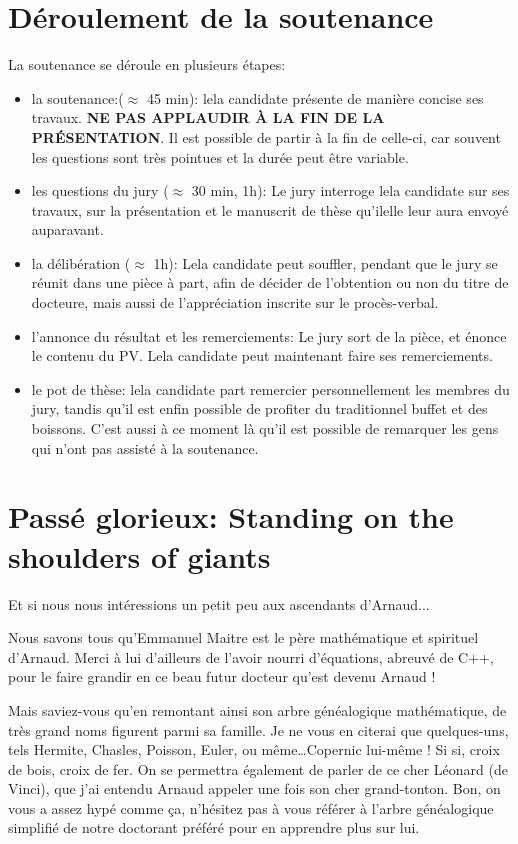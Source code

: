 \documentclass[a4paper]{leaflet}
\newcommand{\ei}{\textperiodcentered}
\begin{document}
\section*{Déroulement de la soutenance}
La soutenance se déroule en plusieurs étapes:
\begin{itemize}
\item la soutenance:($\approx$ 45 min):
  le\ei la candidat\ei e présente de manière concise ses travaux.  \textbf{NE PAS APPLAUDIR À LA FIN DE LA PRÉSENTATION}.  Il est possible de partir à la fin de celle-ci, car souvent les questions sont très pointues et la durée peut être variable.
\item les questions du jury ($\approx$ 30 min, 1h):
  Le jury interroge le\ei la candidat\ei e sur ses travaux, sur la présentation et le manuscrit de thèse qu'il\ei elle leur aura envoyé auparavant.
\item la délibération ($\approx$ 1h):
  Le\ei la candidat\ei e peut souffler, pendant que le jury se réunit dans une pièce à part, afin de décider de l'obtention ou non du titre de docteur\ei e, mais aussi de l'appréciation inscrite sur le procès-verbal.
\item l'annonce du résultat et les remerciements:
  Le jury sort de la pièce, et énonce le contenu du PV. Le\ei la candidat\ei e peut maintenant faire ses remerciements.
\item le pot de thèse:
  le\ei la candidat\ei e part remercier personnellement les membres du jury, tandis qu'il est enfin possible de profiter du traditionnel buffet et des boissons. C'est aussi à ce moment là qu'il est possible de remarquer les gens qui n'ont pas assisté à la soutenance.
\end{itemize}

\section*{Passé glorieux: Standing on the shoulders of giants}

Et si nous nous intéressions un petit peu aux ascendants d'Arnaud...

Nous savons tous qu'Emmanuel Maitre est le père mathématique et spirituel d'Arnaud. Merci à lui d'ailleurs de l'avoir nourri d'équations, abreuvé de C++, pour le faire grandir en ce beau futur docteur qu'est devenu Arnaud ! 

Mais saviez-vous qu'en remontant ainsi son arbre généalogique mathématique, de très grand noms figurent parmi sa famille. Je ne vous en citerai que quelques-uns, tels Hermite, Chasles, Poisson, Euler, ou même\dots Copernic lui-même ! Si si, croix de bois, croix de fer. On se permettra également de parler de ce cher Léonard (de Vinci), que j'ai entendu Arnaud appeler une fois son \og cher grand-tonton\fg. Bon, on vous a assez hypé comme ça, n'hésitez pas à vous référer à l'arbre généalogique simplifié de notre doctorant préféré pour en apprendre plus sur lui. 
\end{document}
